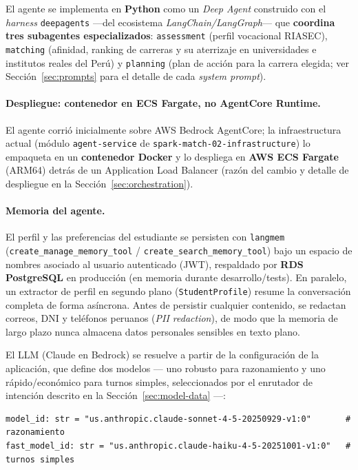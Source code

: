 El agente se implementa en \textbf{Python} como un \emph{Deep Agent} construido
con el \emph{harness} \texttt{deepagents} ---del ecosistema
\emph{LangChain/LangGraph}--- que \textbf{coordina tres subagentes
especializados}: \texttt{assessment} (perfil vocacional RIASEC),
\texttt{matching} (afinidad, ranking de carreras y su aterrizaje en
universidades e institutos reales del Per\'u) y \texttt{planning} (plan de
acci\'on para la carrera elegida; ver Secci\'on~\ref{sec:prompts} para el
detalle de cada \emph{system prompt}).

\paragraph{Despliegue: contenedor en ECS Fargate, no AgentCore Runtime.} El
agente corri\'o inicialmente sobre AWS Bedrock AgentCore; la infraestructura
actual (m\'odulo \texttt{agent-service} de
\texttt{spark-match-02-infrastructure}) lo empaqueta en un \textbf{contenedor
Docker} y lo despliega en \textbf{AWS ECS Fargate} (ARM64) detr\'as de un
Application Load Balancer (raz\'on del cambio y detalle de despliegue en la
Secci\'on~\ref{sec:orchestration}).

\paragraph{Memoria del agente.} El perfil y las preferencias del estudiante se
persisten con \texttt{langmem} (\texttt{create\_manage\_memory\_tool} /
\texttt{create\_search\_memory\_tool}) bajo un espacio de nombres asociado al
usuario autenticado (JWT), respaldado por \textbf{RDS PostgreSQL} en producci\'on
(en memoria durante desarrollo/tests). En paralelo, un extractor de perfil en
segundo plano (\texttt{StudentProfile}) resume la conversaci\'on completa de
forma as\'incrona. Antes de persistir cualquier contenido, se redactan correos,
DNI y tel\'efonos peruanos (\emph{PII redaction}), de modo que la memoria de
largo plazo nunca almacena datos personales sensibles en texto plano.

El LLM (Claude en Bedrock) se resuelve a partir de la configuraci\'on de la
aplicaci\'on, que define dos modelos --- uno robusto para razonamiento y uno
r\'apido/econ\'omico para turnos simples, seleccionados por el enrutador de
intenci\'on descrito en la Secci\'on~\ref{sec:model-data} ---:

\begin{lstlisting}[style=pythonstyle, caption={Configuracion real de modelos (src/config/settings.py)}, label={lst:agent}]
model_id: str = "us.anthropic.claude-sonnet-4-5-20250929-v1:0"       # razonamiento
fast_model_id: str = "us.anthropic.claude-haiku-4-5-20251001-v1:0"   # turnos simples
\end{lstlisting}

